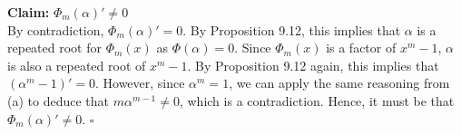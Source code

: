 \documentclass{article}
\begin{document}
\begin{enumerate}
\begin{enumerate}
    \textbf{Claim:} $\Phi_m(\alpha)' \neq 0$ \\

    By contradiction, $\Phi_m(\alpha)' = 0$. By Proposition 9.12, this implies that $\alpha$ is a repeated root for $\Phi_m(x)$ as $\Phi(\alpha) = 0$. Since $\Phi_m(x)$ is a factor of $x^m - 1$, $\alpha$ is also a repeated root of $x^m - 1$. By Proposition 9.12 again, this implies that $(\alpha^m - 1)' = 0$. However, since $\alpha^m = 1$, we can apply the same reasoning from (a) to deduce that $m\alpha^{m-1} \neq 0$, which is a contradiction. Hence, it must be that $\Phi_m(\alpha)' \neq 0$.  \hfill $\square$


\end{enumerate}



\end{enumerate}
\end{document}
